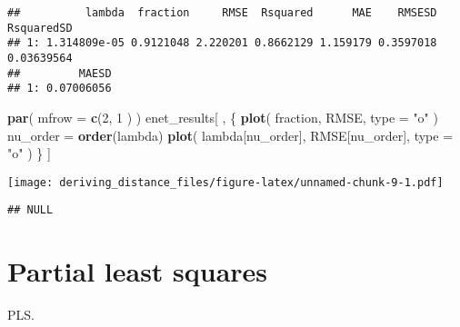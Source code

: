 \documentclass[]{article}
\newenvironment{Shaded}{\begin{snugshade}}{\end{snugshade}}
\newcommand{\DataTypeTok}[1]{\textcolor[rgb]{0.13,0.29,0.53}{#1}}
\newcommand{\DecValTok}[1]{\textcolor[rgb]{0.00,0.00,0.81}{#1}}
\newcommand{\KeywordTok}[1]{\textcolor[rgb]{0.13,0.29,0.53}{\textbf{#1}}}
\newcommand{\NormalTok}[1]{#1}
\newcommand{\OperatorTok}[1]{\textcolor[rgb]{0.81,0.36,0.00}{\textbf{#1}}}
\newcommand{\StringTok}[1]{\textcolor[rgb]{0.31,0.60,0.02}{#1}}
\begin{document}
\begin{verbatim}
##          lambda  fraction     RMSE  Rsquared      MAE    RMSESD RsquaredSD
## 1: 1.314809e-05 0.9121048 2.220201 0.8662129 1.159179 0.3597018 0.03639564
##         MAESD
## 1: 0.07006056
\end{verbatim}

\begin{Shaded}
\begin{Highlighting}[]
\KeywordTok{par}\NormalTok{( }\DataTypeTok{mfrow =} \KeywordTok{c}\NormalTok{(}\DecValTok{2}\NormalTok{, }\DecValTok{1}\NormalTok{ ) )}
\NormalTok{enet_results[ , \{}
    \KeywordTok{plot}\NormalTok{( fraction, RMSE, }\DataTypeTok{type =} \StringTok{"o"}\NormalTok{ )}
\NormalTok{    nu_order =}\StringTok{ }\KeywordTok{order}\NormalTok{(lambda)}
    \KeywordTok{plot}\NormalTok{( lambda[nu_order], RMSE[nu_order], }\DataTypeTok{type =} \StringTok{"o"}\NormalTok{ )}
\NormalTok{\} ]}
\end{Highlighting}
\end{Shaded}

\texttt{[image: deriving\_distance\_files/figure-latex/unnamed-chunk-9-1.pdf]}

\begin{verbatim}
## NULL
\end{verbatim}

\hypertarget{partial-least-squares}{%
\section{Partial least squares}\label{partial-least-squares}}

PLS.

\begin{Shaded}
\end{Shaded}
\end{document}
